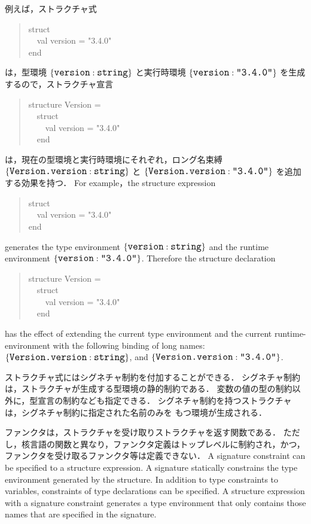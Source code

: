 \documentclass{jbook}
\newcommand{\version}{3.4.0}
\newcommand{\code}[1]{\mbox{\large\tt #1}}
\newcommand{\myem}{\mbox{\ \ }}
\newenvironment{program}{\begin{quote}\begin{tt}}%
                        {\end{tt}\end{quote}}
\begin{document}
\ifjp%
	例えば，ストラクチャ式
\begin{program}
struct\\
\myem val version = "\version"\\
end
\end{program}
は，型環境
$\{\code{version}:\code{string}\}$
と実行時環境
$\{\code{version}:\code{"3.4.0"}\}$
を生成するので，ストラクチャ宣言
\begin{program}
structure Version =\\
\myem struct\\
\myem\myem val version = "\version"\\
\myem end
\end{program}
は，現在の型環境と実行時環境にそれぞれ，ロング名束縛
$\{\code{Version.version}:\code{string}\}$
と
$\{\code{Version.version}:\code{"3.4.0"}\}$
を追加する効果を持つ．
\else%
	For example，the structure expression
\begin{program}
struct\\
\myem val version = "\version"\\
end
\end{program}
generates the type environment
$\{\code{version}:\code{string}\}$
and the runtime environment
$\{\code{version}:\code{"3.4.0"}\}$.
	Therefore the structure declaration
\begin{program}
structure Version =\\
\myem struct\\
\myem\myem val version = "\version"\\
\myem end
\end{program}
has the effect of extending the current type environment and the current
runtime-environment with the following binding of long names:
$\{\code{Version.version}:\code{string}\}$, 
and 
$\{\code{Version.version}:\code{"3.4.0"}\}$.
\fi%

\ifjp%
	ストラクチャ式にはシグネチャ制約を付加することができる．
	シグネチャ制約は，ストラクチャが生成する型環境の静的制約である．
	変数の値の型の制約以外に，型宣言の制約なども指定できる．
	シグネチャ制約を持つストラクチャは，シグネチャ制約に指定された名前のみを
もつ環境が生成される．

	ファンクタは，ストラクチャを受け取りストラクチャを返す関数である．
	ただし，核言語の関数と異なり，ファンクタ定義はトップレベルに制約され，かつ，
ファンクタを受け取るファンクタ等は定義できない．
\else%
	A signature constraint can be specified to a structure expression.
	A signature statically constrains the type environment generated
by the structure.
	In addition to type constraints to variables, constraints of
type declarations can be specified.
	A structure expression with a signature constraint generates a
type environment that only contains those names that are specified in
the signature.
\end{document}
